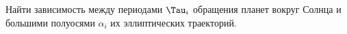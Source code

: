 Найти зависимость между периодами $\Tau_i$ обращения планет вокруг Солнца и большими полуосями $\alpha_i$ их эллиптических
траекторий.
